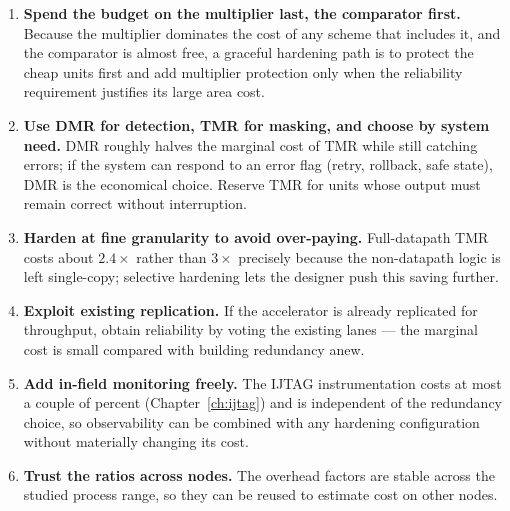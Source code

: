 \begin{enumerate}
  \item \textbf{Spend the budget on the multiplier last, the comparator first.}
        Because the multiplier dominates the cost of any scheme that includes it,
        and the comparator is almost free, a graceful hardening path is to
        protect the cheap units first and add multiplier protection only when the
        reliability requirement justifies its large area cost.
  \item \textbf{Use DMR for detection, TMR for masking, and choose by system
        need.} DMR roughly halves the marginal cost of TMR while still catching
        errors; if the system can respond to an error flag (retry, rollback, safe
        state), DMR is the economical choice. Reserve TMR for units whose output
        must remain correct without interruption.
  \item \textbf{Harden at fine granularity to avoid over-paying.} Full-datapath
        TMR costs about $2.4\times$ rather than $3\times$ precisely because the
        non-datapath logic is left single-copy; selective hardening lets the
        designer push this saving further.
  \item \textbf{Exploit existing replication.} If the accelerator is already
        replicated for throughput, obtain reliability by voting the existing
        lanes --- the marginal cost is small compared with building redundancy
        anew.
  \item \textbf{Add in-field monitoring freely.} The IJTAG instrumentation costs
        at most a couple of percent (Chapter~\ref{ch:ijtag}) and is independent
        of the redundancy choice, so observability can be combined with any
        hardening configuration without materially changing its cost.
  \item \textbf{Trust the ratios across nodes.} The overhead factors are stable
        across the studied process range, so they can be reused to estimate cost
        on other nodes.
\end{enumerate}

